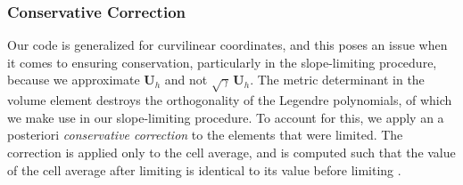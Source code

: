 \documentclass[letterpaper]{jpconf}
\renewcommand{\bs}[1]{\boldsymbol{#1}}
\newcommand{\figref}[1]{Figure~\ref{#1}}
\begin{document}

\subsubsection{Conservative Correction}
Our code is generalized for curvilinear coordinates, and this poses an issue when it comes to ensuring conservation, particularly in the slope-limiting procedure, because we approximate $\bs{U}_{h}$ and not $\sqrt{\gamma}\,\bs{U}_{h}$. The metric determinant in the volume element destroys the orthogonality of the Legendre polynomials, of which we make use in our slope-limiting procedure. To account for this, we apply an a posteriori \textit{conservative correction} to the elements that were limited. The correction is applied only to the cell average, and is computed such that the value of the cell average after limiting is identical to its value before limiting \cite{RadiceRezzolla2011}.

%
\end{document}

